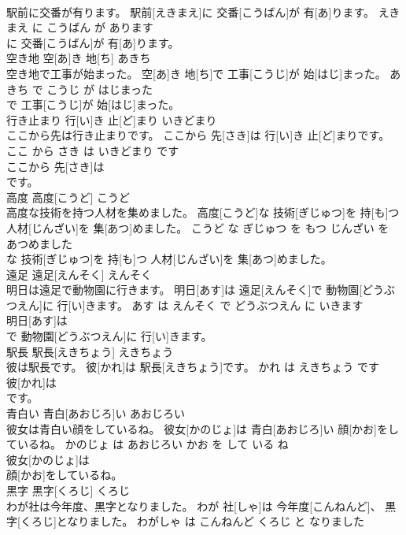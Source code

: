 \documentclass[8pt]{extreport}
\begin{document}
\begin{CJK}{UTF8}{min}
\\	駅前に交番が有ります。	駅前[えきまえ]に 交番[こうばん]が 有[あ]ります。	えきまえ に こうばん が あります	
\\	に 交番[こうばん]が 有[あ]ります。			
\\	空き地	空[あ]き 地[ち]	あきち	
\\	空き地で工事が始まった。	空[あ]き 地[ち]で 工事[こうじ]が 始[はじ]まった。	あきち で こうじ が はじまった	
\\	で 工事[こうじ]が 始[はじ]まった。			
\\	行き止まり	行[い]き 止[ど]まり	いきどまり	
\\	ここから先は行き止まりです。	ここから 先[さき]は 行[い]き 止[ど]まりです。	ここ から さき は いきどまり です	
\\	ここから 先[さき]は
\\	です。			
\\	高度	高度[こうど]	こうど	
\\	高度な技術を持つ人材を集めました。	高度[こうど]な 技術[ぎじゅつ]を 持[も]つ 人材[じんざい]を 集[あつ]めました。	こうど な ぎじゅつ を もつ じんざい を あつめました	
\\	な 技術[ぎじゅつ]を 持[も]つ 人材[じんざい]を 集[あつ]めました。			
\\	遠足	遠足[えんそく]	えんそく	
\\	明日は遠足で動物園に行きます。	明日[あす]は 遠足[えんそく]で 動物園[どうぶつえん]に 行[い]きます。	あす は えんそく で どうぶつえん に いきます	
\\	明日[あす]は
\\	で 動物園[どうぶつえん]に 行[い]きます。			
\\	駅長	駅長[えきちょう]	えきちょう	
\\	彼は駅長です。	彼[かれ]は 駅長[えきちょう]です。	かれ は えきちょう です	
\\	彼[かれ]は
\\	です。			
\\	青白い	青白[あおじろ]い	あおじろい	
\\	彼女は青白い顔をしているね。	彼女[かのじょ]は 青白[あおじろ]い 顔[かお]をしているね。	かのじょ は あおじろい かお を して いる ね	
\\	彼女[かのじょ]は
\\	顔[かお]をしているね。			
\\	黒字	黒字[くろじ]	くろじ	
\\	わが社は今年度、黒字となりました。	わが 社[しゃ]は 今年度[こんねんど]、 黒字[くろじ]となりました。	わがしゃ は こんねんど くろじ と なりました	

\end{CJK}
\end{document}
